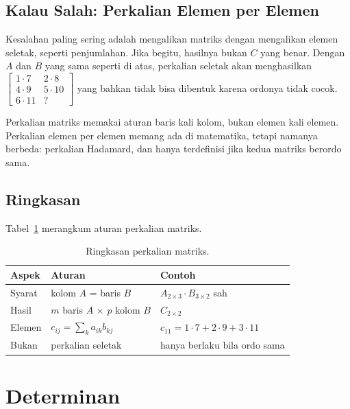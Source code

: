 \documentclass[11pt,a4paper]{article}
\begin{document}
\subsection{Kalau Salah: Perkalian Elemen per Elemen}

Kesalahan paling sering adalah mengalikan matriks dengan mengalikan elemen seletak, seperti penjumlahan. Jika begitu, hasilnya bukan $C$ yang benar. Dengan $A$ dan $B$ yang sama seperti di atas, perkalian seletak akan menghasilkan $\begin{bmatrix}1 \cdot 7&2 \cdot 8\\4 \cdot 9&5 \cdot 10\\6 \cdot 11&?\end{bmatrix}$ yang bahkan tidak bisa dibentuk karena ordonya tidak cocok.

Perkalian matriks memakai aturan baris kali kolom, bukan elemen kali elemen. Perkalian elemen per elemen memang ada di matematika, tetapi namanya berbeda: perkalian Hadamard, dan hanya terdefinisi jika kedua matriks berordo sama.

\subsection{Ringkasan}

Tabel~\ref{tab:perkalian} merangkum aturan perkalian matriks.

\begin{table}[H]
	\centering
	\caption{Ringkasan perkalian matriks.}
	\label{tab:perkalian}
	\small
	\begin{tabularx}{\textwidth}{l X X}
		\toprule
		Aspek  & Aturan                               & Contoh                                      \\
		\midrule
		Syarat & kolom $A$ = baris $B$                & $A_{2\times 3} \cdot B_{3\times 2}$ sah     \\
		Hasil  & $m$ baris $A$ $\times$ $p$ kolom $B$ & $C_{2\times 2}$                             \\
		Elemen & $c_{ij}=\sum_{k} a_{ik} b_{kj}$      & $c_{11}=1 \cdot 7 + 2 \cdot 9 + 3 \cdot 11$ \\
		Bukan  & perkalian seletak                    & hanya berlaku bila ordo sama                \\
		\bottomrule
	\end{tabularx}
\end{table}

\section{Determinan}
\end{document}

